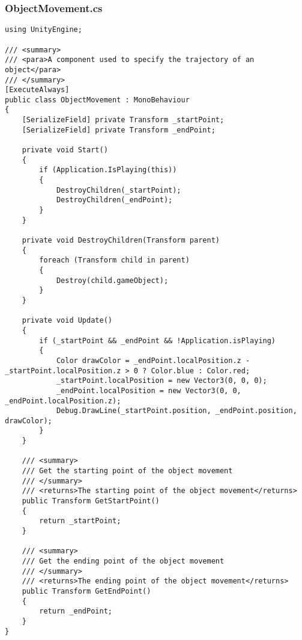 \subsubsection*{ObjectMovement.cs}
\begin{verbatim}
using UnityEngine;

/// <summary>
/// <para>A component used to specify the trajectory of an object</para>
/// </summary>
[ExecuteAlways]
public class ObjectMovement : MonoBehaviour
{
    [SerializeField] private Transform _startPoint;
    [SerializeField] private Transform _endPoint;

    private void Start()
    {
        if (Application.IsPlaying(this))
        {
            DestroyChildren(_startPoint);
            DestroyChildren(_endPoint);
        }
    }

    private void DestroyChildren(Transform parent)
    {
        foreach (Transform child in parent)
        {
            Destroy(child.gameObject);
        }
    }

    private void Update()
    {
        if (_startPoint && _endPoint && !Application.isPlaying)
        {
            Color drawColor = _endPoint.localPosition.z - _startPoint.localPosition.z > 0 ? Color.blue : Color.red;
            _startPoint.localPosition = new Vector3(0, 0, 0);
            _endPoint.localPosition = new Vector3(0, 0, _endPoint.localPosition.z);
            Debug.DrawLine(_startPoint.position, _endPoint.position, drawColor);
        }
    }

    /// <summary>
    /// Get the starting point of the object movement
    /// </summary>
    /// <returns>The starting point of the object movement</returns>
    public Transform GetStartPoint()
    {
        return _startPoint;
    }

    /// <summary>
    /// Get the ending point of the object movement
    /// </summary>
    /// <returns>The ending point of the object movement</returns>
    public Transform GetEndPoint()
    {
        return _endPoint;
    }
}
\end{verbatim}
